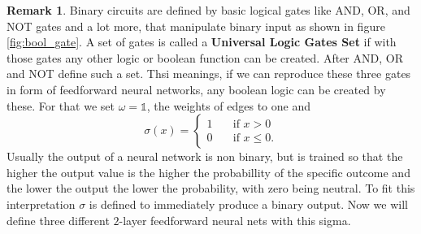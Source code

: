 \documentclass{article}
\theoremstyle{definition}
\newtheorem{remark}[theorem]{Remark}
\begin{document}
\begin{remark}
Binary circuits are defined by basic logical gates like AND, OR, and NOT gates and a lot more, that manipulate binary input as shown in figure \ref{fig:bool_gate}. A set of gates is called a \textbf{Universal Logic Gates Set} if with those gates any other logic or boolean function can be created. After \cite{quine1955way} AND, OR and NOT define such a set. Thsi meanings, if we can reproduce these three gates in form of feedforward neural networks, any boolean logic can be created by these. For that we set $\omega=\mathds{1}$, the weights of edges to one and
\[ \sigma(x) = 
  \begin{cases}
    1       & \quad \text{if } x > 0\\
    0  		& \quad \text{if } x \leq 0.
  \end{cases}
\]
Usually the output of a neural network is non binary, but is trained so that the higher the output value is the higher the probabillity of the specific outcome and the lower the output the lower the probability, with zero being neutral. To fit this interpretation $\sigma$ is defined to immediately produce a binary output. Now we will define three different $2$-layer feedforward neural nets with this sigma.



\end{remark}
\end{document}
